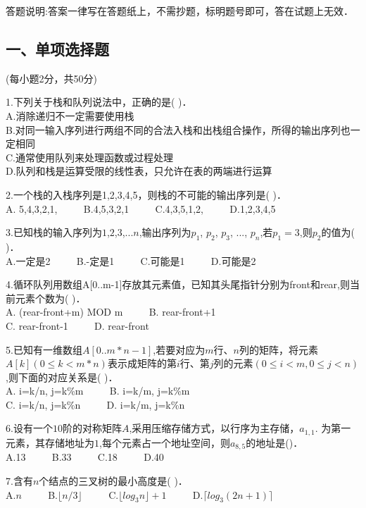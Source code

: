 
答题说明:答案一律写在答题纸上，不需抄题，标明题号即可，答在试题上无效．

\subsection{一、单项选择题}
(每小题2分，共50分)

1.下列关于栈和队列说法中，正确的是(    )． \\
A.消除递归不一定需要使用栈 \\
B.对同一输入序列进行两组不同的合法入栈和出栈组合操作，所得的输出序列也一定相同 \\
C.通常使用队列来处理函数或过程处理 \\
D.队列和栈是运算受限的线性表，只允许在表的两端进行运算

2.一个栈的入栈序列是1,2,3,4,5，则栈的不可能的输出序列是( )． \\
A. 5,4,3,2,1,  $\qquad$ B.4,5,3,2,1 $\qquad$ C.4,3,5,1,2, $\qquad$ D.1,2,3,4,5

3.已知栈的输入序列为$1$,$2$,$3$,...$n$,输出序列为$p_1$, $p_2$, $p_3$, ..., $p_n$,若$p_1=3$,则$p_2$的值为(    )． \\
A.一定是2 $\qquad$ B.-定是1 $\qquad$ C.可能是1 $\qquad$ D.可能是2

4.循环队列用数组A[0..m-1]存放其元素值，已知其头尾指针分别为front和rear,则当前元素个数为( )． \\
A. (rear-front+m) MOD m $\qquad$ B. rear-front+1 \\
C. rear-front-1 $\qquad$ D. rear-front

5.已知有一维数组$A[0..m*n-1]$,若要对应为$m$行、$n$列的矩阵，将元素$A[k](0\leqslant k<m*n)$表示成矩阵的第$i$行、第$j$列的元素$(0\leqslant i<m, 0\leqslant j<n)$,则下面的对应关系是(    )． \\
A. i=k/n, j=k\%m $\qquad$ B. i=k/m, j=k\%m \\
C. i=k/n, j=k\%n $\qquad$ D. i=k/m, j=k\%n

6.设有一个$10$阶的对称矩阵$A$,采用压缩存储方式，以行序为主存储，$a_{1,1}$. 为第一元素，其存储地址为$1$,每个元素占一个地址空间，则$a_{8,5}$的地址是()． \\
A.13 $\qquad$ B.33 $\qquad$ C.18 $\qquad$ D.40

7.含有$n$个结点的三叉树的最小高度是(    )． \\
A.$n$ $\qquad$ B.$\lfloor n/3 \rfloor$ $\qquad$ C.$\lfloor log_3n\rfloor+1$ $\qquad$ D.$\lceil log_3(2n+1)\rceil$


